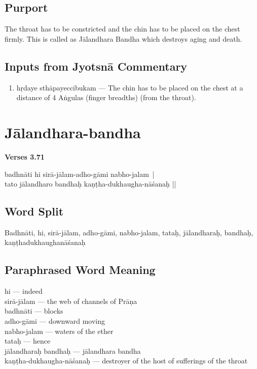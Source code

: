 \subsection*{Purport}

The throat has to be constricted and the chin has to be placed on the chest firmly. This is called as Jālandhara Bandha which destroys aging and death. 

\subsection*{Inputs from Jyotsnā Commentary}

\begin{enumerate}
\item hṛdaye sthāpayeccibukam --- The chin has to be placed on the chest at a distance of 4 Aṅgulas (finger breadths) (from the throat).
\end{enumerate}
\newpage

\section*{Jālandhara-bandha}

\noindent \textbf{Verses 3.71}

\begin{shloka}
badhnāti hi sirā-jālam-adho-gāmi nabho-jalam |\\
tato jālandharo bandhaḥ kaṇṭha-dukhaugha-nāśanaḥ ||
\end{shloka}

\subsection*{Word Split}

Badhnāti, hi, sirā-jālam, adho-gāmi, nabho-jalam,  tataḥ, jālandharaḥ, bandhaḥ, kaṇṭhadukhaughanāśanaḥ 

\subsection*{Paraphrased Word Meaning}

\begin{multicols}{2}
hi --- indeed \\
sirā-jālam --- the web of channels of Prāṇa\\
badhnāti --- blocks \\
adho-gāmi ---  downward moving \\
nabho-jalam --- waters of the ether\\
tataḥ --- hence \\
jālandharaḥ bandhaḥ --- jālandhara bandha\\
kaṇṭha-dukhaugha-nāśanaḥ --- destroyer of the host of sufferings of the throat
\end{multicols}

